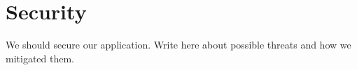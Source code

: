 \section{Security}

We should secure our application.
Write here about possible threats and how we mitigated them.
